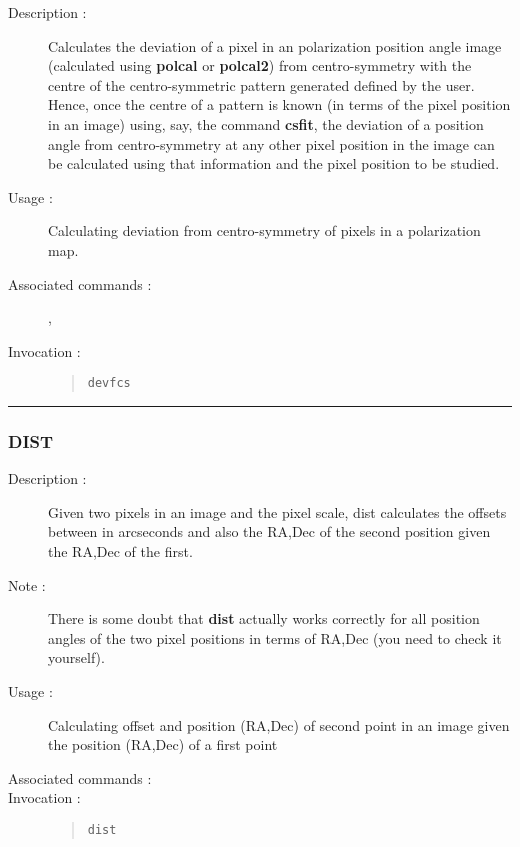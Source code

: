 \begin{description}

\item[Description :] Calculates the deviation of a pixel in an
polarization position angle image (calculated using {\bf polcal} or
{\bf polcal2}) from centro-symmetry with the centre of the
centro-symmetric pattern generated defined by the user.  Hence, once
the centre of a pattern is known (in terms of the pixel position in an
image) using, say, the command {\bf csfit}, the deviation of a position
angle from centro-symmetry at any other pixel position in the image can
be calculated using that information and the pixel position to be
studied.

\item[Usage :] Calculating deviation from centro-symmetry of pixels in a
polarization map.

\item[Associated commands :] {\tt {}}, 
{\tt {}}

\item[Invocation :]

\begin{quote}{\tt  devfcs }\end{quote}

\end{description}

\hrule 
\subsubsection*{\label{DIST}DIST}

\begin{description}

\item[Description :] Given two pixels in an image and the pixel scale,
dist calculates the offsets between in arcseconds and also the RA,Dec
of the second position given the RA,Dec of the first.  

\item[Note :] There is some doubt that {\bf dist} actually works correctly
for all position angles of the two pixel positions in terms of RA,Dec
(you need to check it yourself).

\item[Usage :] Calculating offset and position (RA,Dec) of second point in 
an image given the position (RA,Dec) of a first point
\item[Associated commands :] {\tt {}}
\item[Invocation :]

\begin{quote}{\tt  dist }\end{quote}

\end{description}

